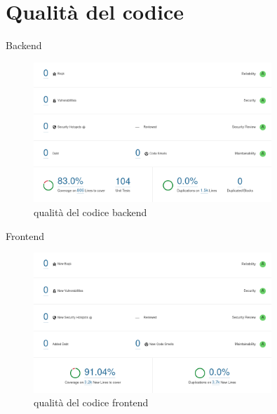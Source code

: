 \documentclass{beamer}
\begin{document}
\section{Qualit\`a del codice}
\begin{frame}{Backend}
	\begin{figure}
		\includegraphics[width=0.8\textwidth]{quality-backend-overall}
		\caption{qualit\`a del codice backend}
	\end{figure}
\end{frame}

\begin{frame}{Frontend}
	\begin{figure}
		\includegraphics[width=0.8\textwidth]{quality-frontend-overall}
		\caption{qualit\`a del codice frontend}
	\end{figure}
\end{frame}
\end{document}
